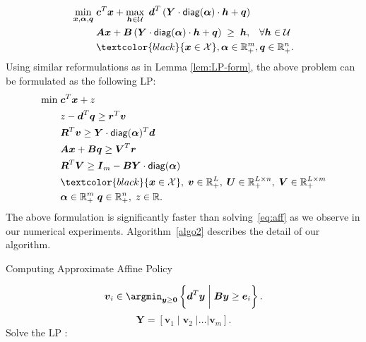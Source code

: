\documentclass[moor]{informs1}              %
\newcommand{\mb}[1]{\ensuremath{\boldsymbol{#1}}}
\newcommand*{\red}{\textcolor{black}}
\begin{document}
{\begin{equation}
\begin{aligned}
 \min_{\mb x, \mb \alpha, \mb q} \; & \mb{c}^T \mb{x} + \max_{\mb{h}\in {\cal U}} \; \mb{d}^T\left( \mb Y \cdot {\sf diag}  ( \mb {\alpha} ) \cdot \mb{h}+\mb{q}\right) \\
& \mb{A}\mb{x} + \mb{B}\left( \mb Y \cdot {\sf diag}  ( \mb {\alpha} )\cdot \mb{h}+\mb{q}\right) \; \geq \; \mb{h},   \; \; \; \forall \mb h \in {\cal U} \\
& \red{\mb{x}  \in  {\cal X} }, \mb{\alpha}   \in  {\mathbb R}^{m}_+, \mb{q}   \in  {\mathbb R}^{n}_+.\\
\end{aligned}
\end{equation}
Using similar reformulations as in Lemma \eqref{lem:LP-form}, the above problem can be formulated as the following LP:
\begin{equation}\label{eq:aff:approx2}
\begin{aligned}
 \min \; &  \mb{c}^T \mb{x} + z \\
& z- \mb d^T \mb q \geq \mb r^T \mb v \\
& \mb R^T \mb v \geq \mb Y \cdot {\sf diag}  ( \mb {\alpha} )^T \mb d \\
& \mb A \mb x + \mb B \mb q \geq \mb V^T \mb r\\
& \mb R^T \mb V \geq \mb I_m - \mb B \mb Y \cdot {\sf diag}  ( \mb {\alpha} ) \\
& \red{\mb{x}  \in  {\cal X} }, \; \mb{v}   \in  {\mathbb R}^{L}_+, \; \mb{U}   \in  {\mathbb R}^{L \times n}_+, \; \mb{V}   \in  {\mathbb R}^{L \times m}_+ \\
&  \mb{\alpha}   \in  {\mathbb R}^{m}_+ \; \mb q \in \mathbb{R}_+^n, \; z \in \mathbb{R}.   \\
\end{aligned}
\end{equation}
The above formulation is significantly faster than solving~\eqref{eq:aff} as we observe in our numerical experiments. Algorithm~\ref{algo2} describes the detail of our algorithm.
\begin{algorithm}[H]
\caption{Computing Approximate Affine Policy }\label{algo2}
\begin{algorithmic}[1]
 \State $$ \mb v_i \in  \argmin_{\mb y \geq \mb 0} \left\{ \mb d^T \mb y \; \bigg\vert \;   \mb B \mb y \geq  \mb e_i  \right\}.$$
 \EndFor
 \State  $$ \mb Y = [ \mb v_1 \; \vert \; \mb v_2 \; \vert \ldots \vert \mb v_m ].$$
 \State Solve the LP :
 \begin{equation*}\label{eq:aff:approx22}

\end{equation*}
\end{algorithmic}
\end{algorithm}}
\end{document}

